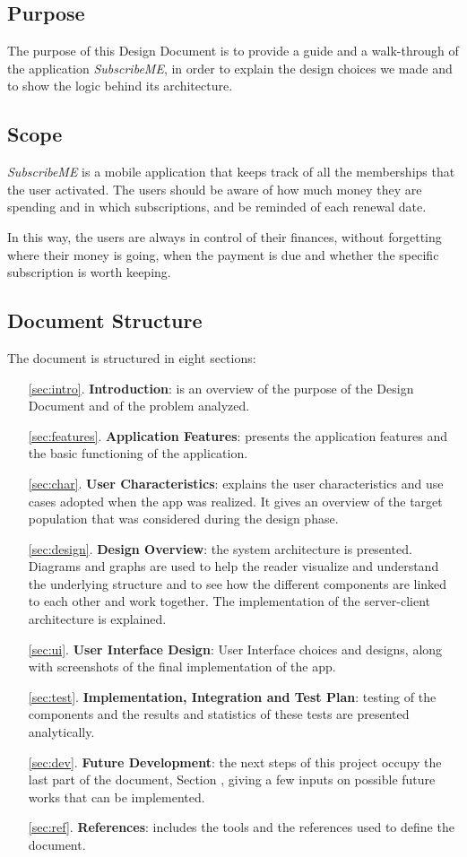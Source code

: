 \documentclass[12pt]{article}
\begin{document}
\subsection{Purpose}
The purpose of this Design Document is to provide a guide and a walk-through of the application \textit{SubscribeME}, in order to explain the design choices we made and to show the logic behind its architecture.

\subsection{Scope}
\textit{SubscribeME} is a mobile application that keeps track of all the memberships that the user activated. The users should be aware of how much money they are spending and in which subscriptions, and be reminded of each renewal date.

In this way, the users are always in control of their finances, without forgetting where their money is going, when the payment is due and whether the specific subscription is worth keeping.

\subsection{Document Structure}
The document is structured in eight sections:
\begin{enumerate}
    \item[\ref{sec:intro}.] \textbf{Introduction}: is an overview of the purpose of the Design Document and of the problem analyzed.
    \item[\ref{sec:features}.] \textbf{Application Features}: presents the application features and the basic functioning of the application.
    \item[\ref{sec:char}.] \textbf{User Characteristics}: explains the user characteristics and use cases adopted when the app was realized. It gives an overview of the target population that was considered during the design phase.
    \item[ \ref{sec:design}.] \textbf{Design Overview}: the system architecture is presented. Diagrams and graphs are used to help the reader visualize and understand the underlying structure and to see how the different components are linked to each other and work together. The implementation of the server-client architecture is explained.
    \item[\ref{sec:ui}.] \textbf{User Interface Design}: User Interface choices and designs, along with screenshots of the final implementation of the app.
    \item[\ref{sec:test}.] \textbf{Implementation, Integration and Test Plan}: testing of the components and the results and statistics of these tests are presented analytically.
    \item[\ref{sec:dev}.] \textbf{Future Development}: the next steps of this project occupy the last part of the document, Section , giving a few inputs on possible future works that can be implemented.
    \item[\ref{sec:ref}.] \textbf{References}: includes the tools and the references used to define the document.
\end{enumerate}
\end{document}
